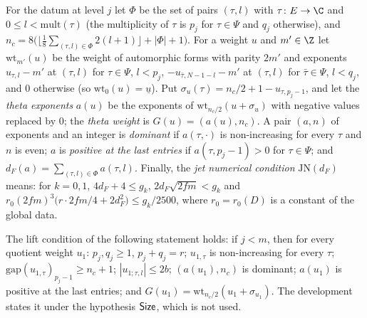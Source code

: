 \begin{definition}\label{pf:lift2:def:theta}
For the datum at level $j$ let $\Phi$ be the set of pairs $(\tau,l)$ with $\tau\colon E\to\C$ and $0\le l<\mathrm{mult}(\tau)$
(the multiplicity of $\tau$ is $p_j$ for $\tau\in\Psi$ and $q_j$ otherwise), and
$n_c=8\bigl(\lfloor\frac18\sum_{(\tau,l)\in\Phi}2(l+1)\rfloor+|\Phi|+1\bigr)$. For a weight $u$ and $m'\in\Z$ let
$\mathrm{wt}_{m'}(u)$ be the weight of automorphic forms with parity $2m'$ and exponents $u_{\tau,l}-m'$ at $(\tau,l)$
for $\tau\in\Psi$, $l<p_j$, $-u_{\bar\tau,N-1-l}-m'$ at $(\tau,l)$ for $\bar\tau\in\Psi$, $l<q_j$, and $0$ otherwise
(so $\mathrm{wt}_0(u)=\underline u$). Put $\sigma_u(\tau)=n_c/2+1-u_{\tau,p_j-1}$, and let the \emph{theta exponents}
$a(u)$ be the exponents of $\mathrm{wt}_{n_c/2}(u+\sigma_u)$ with negative values replaced by $0$; the \emph{theta
weight} is $G(u)=(a(u),n_c)$. A pair $(a,n)$ of exponents and an integer is \emph{dominant} if $a(\tau,\cdot)$ is
non-increasing for every $\tau$ and $n$ is even; $a$ is \emph{positive at the last entries} if $a(\tau,p_j-1)>0$ for
$\tau\in\Psi$; and $d_F(a)=\sum_{(\tau,l)\in\Phi}a(\tau,l)$. Finally, the \emph{jet numerical condition}
$\mathrm{JN}(d_F)$ means: for $k=0,1$, $4d_F+4\le g_k$, $2d_F\sqrt{2fm}<g_k$ and
$r_0(2fm)^3\bigl(r\cdot2fm/4+2d_F^2\bigr)\le g_k/2500$, where $r_0=r_0(D)$ is a constant of the global data.
\end{definition}

\begin{proposition}\label{pf:lift2:quoshape}
The lift condition of the following statement holds: if $j<m$, then for every quotient weight $u_1$: $p_j,q_j\ge1$,
$p_j+q_j=r$; $u_{1,\tau}$ is non-increasing for every $\tau$; $\mathrm{gap}(u_{1,\tau})_{p_j-1}\ge n_c+1$;
$|u_{1;\tau,l}|\le2b$; $(a(u_1),n_c)$ is dominant; $a(u_1)$ is positive at the last entries; and
$G(u_1)=\mathrm{wt}_{n_c/2}(u_1+\sigma_{u_1})$. The development states it under the hypothesis $\mathsf{Size}$, which
is not used.
\end{proposition}

